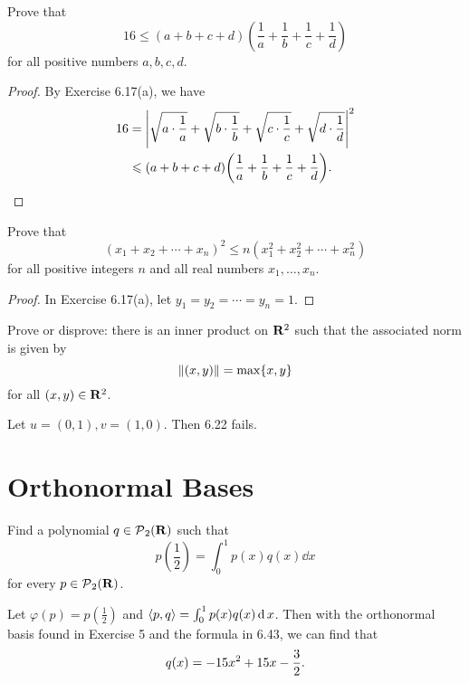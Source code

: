 \begin{exercise}{11}
	Prove that
	\[
		16 \le (a + b + c + d)\left(\frac{1}{a} + \frac{1}{b} + \frac{1}{c} + \frac{1}{d}\right)
	\]
	for all positive numbers \( a, b, c, d \).
\end{exercise}

\begin{proof}
	By Exercise 6.17(a), we have
	\begin{align*}
		16 &= \abs{\sqrt{a \cdot \frac{1}{a}} + \sqrt{b \cdot \frac{1}{b}} + \sqrt{c \cdot \frac{1}{c}} + \sqrt{d \cdot \frac{1}{d}}}^{2} \\
			 &\le (a + b + c + d)\left(\frac{1}{a} + \frac{1}{b} + \frac{1}{c} + \frac{1}{d}\right). \qedhere
	\end{align*}
\end{proof}

\begin{exercise}{12} Prove that \[
		(x_{1} + x_{2} + \cdots + x_{n})^{2} \le n\left(x_{1}^{2} + x_{2}^{2} + \cdots + x_{n}^{2}\right)
	\]
	for all positive integers \( n \) and all real numbers \( x_{1}, \ldots, x_{n} \).
\end{exercise}

\begin{proof}
	In Exercise 6.17(a), let \( y_{1} = y_{2} = \cdots = y_{n} = 1 \).
\end{proof}

\begin{exercise}{17}
	Prove or disprove: there is an inner product on \( \mathbf{R}^{2} \) such that the associated norm is given by
	\[
		\norm{(x, y)} = \max\{x, y\}
	\]
	for all \( (x, y) \in \mathbf{R}^{2} \).
\end{exercise}

\begin{countexam}
	Let \( u = (0, 1), v = (1, 0) \). Then 6.22 fails.
\end{countexam}

\section{Orthonormal Bases}

\begin{exercise}
	Find a polynomial \( q \in \operatorname{\mathcal{P}}_{2}(\mathbf{R}) \) such that
	\[
		p\left(\frac{1}{2}\right) = \int_{0}^{1} p(x)q(x)\dd{x}
	\]
	for every \( p \in \operatorname{\mathcal{P}}_{2}(\mathbf{R}) \).
\end{exercise}

\begin{solution}
	Let \( \varphi(p) = p\left(\frac{1}{2}\right) \) and \( \inp{p}{q} = \int_{0}^{1} p(x)q(x)\dd{x} \). Then with the orthonormal basis found in Exercise 5 and the formula in 6.43, we can find that
	\[
		q(x) = -15x^{2} + 15x - \frac{3}{2}. \qedhere
	\]
\end{solution}
